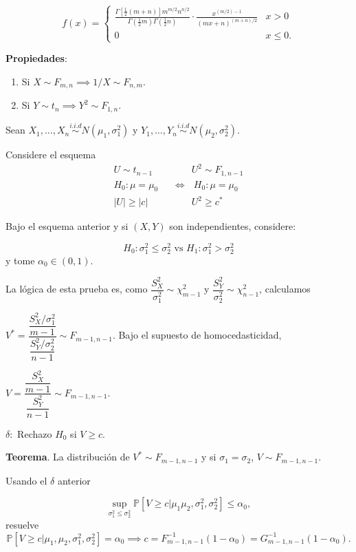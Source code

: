 \documentclass[
  12pt,
]{book}
\begin{document}
\begin{equation}
f(x)= 
\begin{cases} 
\displaystyle \frac{\Gamma\left[\frac{1}{2}(m+n)\right] m^{m / 2} n^{n / 2}}{\Gamma\left(\frac{1}{2} m\right) \Gamma\left(\frac{1}{2} n\right)} \cdot \frac{x^{(m / 2)-1}}{(m x+n)^{(m+n) / 2}} & x>0 \\
0 & x\leq 0.
\end{cases}
\end{equation}

\textbf{Propiedades}:

\begin{enumerate}
\def\labelenumi{\arabic{enumi}.}
\item
  Si \(X\sim F_{m,n} \implies 1/X\sim F_{n,m}\).
\item
  Si \(Y\sim t_n \implies Y^2\sim F_{1,n}\).
\end{enumerate}

Sean \(X_1,\dots, X_n\overset{i.i.d}{\sim} N(\mu_1,\sigma_1^2)\) y \(Y_1,\dots, Y_n\overset{i.i.d}{\sim} N(\mu_2,\sigma_2^2)\).

Considere el esquema
\begin{align*}
U\sim t_{n-1}\text{  }& \quad \quad U^2\sim F_{1,n-1}\\
H_0: \mu=\mu_0\text{  } & \Leftrightarrow \text{  }  H_0: \mu=\mu_0 \\
|U|\geq |c|\text{  } & \quad \quad  U^2\geq c^* 
\end{align*}

Bajo el esquema anterior y si \((X,Y)\) son independientes, considere:

\[H_0: \sigma_1^2\leq \sigma_2^2 \text { vs } H_1: \sigma_1^2> \sigma_2^2 \]
y tome \(\alpha_0 \in (0,1)\).

La lógica de esta prueba es, como \(\dfrac{S_X^2}{\sigma_1^2} \sim \chi^2_{m-1}\)
y \(\dfrac{S_Y^2}{\sigma_2^2} \sim \chi^2_{n-1}\), calculamos

\(V^* = \dfrac{\dfrac{S_X^2/\sigma_1^2}{m-1}}{\dfrac{S_Y^2/\sigma_2^2}{n-1}}\sim F_{m-1,n-1}\).
Bajo el supuesto de homocedasticidad,

\(V = \dfrac{\dfrac{S_X^2}{m-1}}{\dfrac{S_Y^2}{n-1}}\sim F_{m-1,n-1}\).

\(\delta:\) Rechazo \(H_0\) si \(V\geq c\).

\textbf{Teorema}. La distribución de \(V^*\sim F_{m-1,n-1}\) y si \(\sigma_1=\sigma_2\), \(V \sim F_{m-1,n-1}\).

Usando el \(\delta\) anterior

\[\sup_{\sigma_1^2\leq\sigma^2_2}\mathbb P[V\geq c|\mu_1\mu_2,\sigma^2_1,\sigma_2^2]\leq \alpha_0,\]
resuelve
\[\mathbb P[V\geq c|\mu_1,\mu_2,\sigma_1^2,\sigma_2^2] = \alpha_0 \implies c = F^{-1}_{m-1,n-1}(1-\alpha_0) = G^{-1}_{m-1,n-1}(1-\alpha_0).\]
\end{document}
